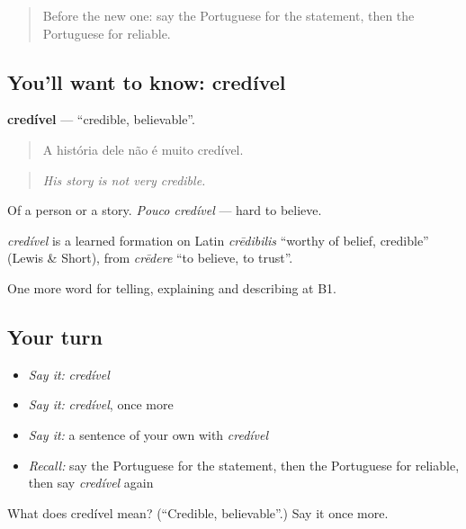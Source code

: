 \begin{quote}
Before the new one: say the Portuguese for the statement, then the Portuguese for reliable.
\end{quote}

\subsection*{You'll want to know: credível}
\textbf{credível} — \textquotedblleft{}credible, believable\textquotedblright{}.

\begin{quote}
A história dele não é muito credível.
\end{quote}

\begin{quote}
\emph{His story is not very credible.}
\end{quote}

Of a person or a story. \emph{Pouco credível} — hard to believe.

\begin{cousinweb}
\emph{credível} is a learned formation on Latin \emph{crēdibilis} \textquotedblleft{}worthy of belief, credible\textquotedblright{} (Lewis \& Short), from \emph{crēdere} \textquotedblleft{}to believe, to trust\textquotedblright{}.
\end{cousinweb}

\begin{grammarlens}[title={What you've built}]
One more word for telling, explaining and describing at B1.
\end{grammarlens}

\subsection*{Your turn}
\begin{itemize}
\raggedright
  \item \emph{Say it:} \emph{credível}
  \item \emph{Say it:} \emph{credível}, once more
  \item \emph{Say it:} a sentence of your own with \emph{credível}
  \item \emph{Recall:} say the Portuguese for the statement, then the Portuguese for reliable, then say \emph{credível} again
\end{itemize}

\begin{tcolorbox}[breakable,colback=teal!4,colframe=teal!35!black,title={Before you move on}]
What does credível mean? (\textquotedblleft{}Credible, believable\textquotedblright{}.) Say it once more.
\end{tcolorbox}
